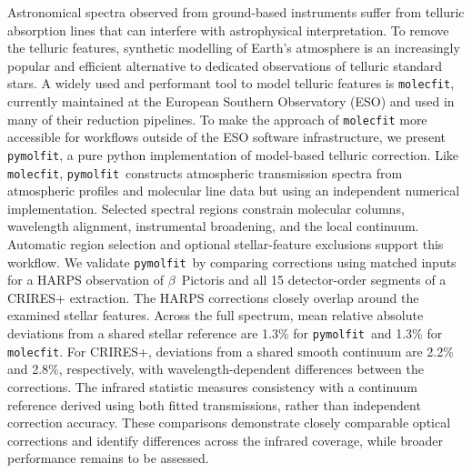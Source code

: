 \documentclass{aa}
\newcommand{\molecfit}{{\texttt{molecfit}}}
\newcommand{\pymolfit}{\texttt{pymolfit}}
\begin{document}
  \abstract
   {Astronomical spectra observed from ground-based instruments suffer from telluric absorption lines that can interfere with astrophysical interpretation. To remove the telluric features, synthetic modelling of Earth's atmosphere is an increasingly popular and efficient alternative to dedicated observations of telluric standard stars. A widely used and performant tool to model telluric features is \texttt{molecfit}, currently maintained at the European Southern Observatory (ESO) and used in many of their reduction pipelines.}
   {To make the approach of \texttt{molecfit} more accessible for workflows outside of the ESO software infrastructure, we present \pymolfit, a pure python implementation of model-based telluric correction.} 
   {Like \molecfit, \pymolfit\ constructs atmospheric transmission spectra from atmospheric profiles and molecular line data but using an independent numerical implementation. Selected spectral regions constrain molecular columns, wavelength alignment, instrumental broadening, and the local continuum. Automatic region selection and optional stellar-feature exclusions support this workflow. We validate \pymolfit\ by comparing corrections using matched inputs for a HARPS observation of $\beta$~Pictoris and all 15 detector-order segments of a CRIRES+ extraction.}
   {The HARPS corrections closely overlap around the examined stellar features. Across the full spectrum, mean relative absolute deviations from a shared stellar reference are 1.3\% for \pymolfit\ and 1.3\% for \molecfit. For CRIRES+, deviations from a shared smooth continuum are 2.2\% and 2.8\%, respectively, with wavelength-dependent differences between the corrections. The infrared statistic measures consistency with a continuum reference derived using both fitted transmissions, rather than independent correction accuracy. These comparisons demonstrate closely comparable optical corrections and identify differences across the infrared coverage, while broader performance remains to be assessed.}
   {}

   \keywords{}

   \maketitle


\end{document}
